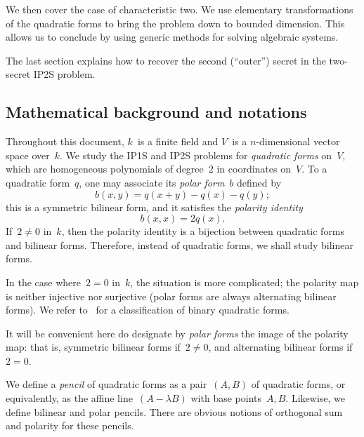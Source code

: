 \documentclass{lms}
\begin{document}
We then cover the case of characteristic two.
We use elementary transformations of the quadratic forms
to bring the problem down to bounded dimension.
This allows us to conclude by using generic methods
for solving algebraic systems.


The last section explains how to recover the second (``outer'') secret
in the two-secret IP2S problem.

\subsection*{Mathematical background and notations}
Throughout this document, $k$~is a finite field
and $V$~is a $n$-dimensional vector space over~$k$.
We study the IP1S and IP2S problems for \emph{quadratic forms} on~$V$,
which are homogeneous polynomials of degree~$2$ in coordinates on~$V$.
To a quadratic form~$q$,
one may associate its \emph{polar form}~$b$ defined by
\begin{equation*}\label{eq:polar}
b(x,y) = q(x+y) - q(x) - q(y);
\end{equation*}
this is a symmetric bilinear form,
and it satisfies the \emph{polarity identity}
\begin{equation*}\label{eq:polarity}
b(x,x) = 2q(x).
\end{equation*}
If~$2 ≠ 0$ in~$k$, then the polarity identity is a bijection between
quadratic forms and bilinear forms.
Therefore, instead of quadratic forms, we shall study bilinear forms.

In the case where~$2 = 0$ in~$k$, the situation is more complicated;
the polarity map is neither injective nor surjective
(polar forms are always alternating bilinear forms).
We refer to~\cite{milnorhusemoller} for a classification of
binary quadratic forms.

It will be convenient here do designate by \emph{polar forms}
the image of the polarity map: that is, symmetric bilinear forms if~$2 ≠ 0$,
and alternating bilinear forms if~$2 = 0$.

\medbreak
We define a \emph{pencil} of quadratic forms
as a pair~$(A, B)$ of quadratic forms,
or equivalently, as the affine line~$(A - λ B)$ with base points~$Α, B$.
Likewise, we define bilinear and polar pencils.
There are obvious notions of orthogonal sum and polarity for these pencils.
\end{document}
